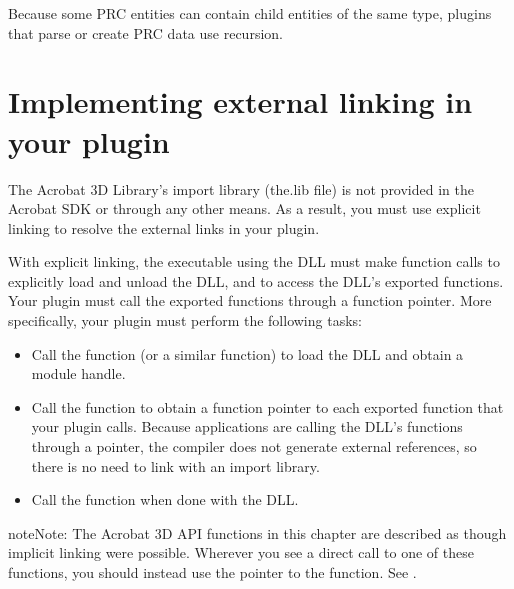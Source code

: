 \documentclass[letterpaper,12pt,english,openany,oneside]{sphinxmanual}
\begin{document}
\noindent{}

Because some PRC entities can contain child entities of the same type, plugins that parse or create PRC data use recursion.


\section{Implementing external linking in your plugin}
\label{\detokenize{Plugins_A3D_API:implementing-external-linking-in-your-plugin}}
The Acrobat 3D Library’s import library (the.lib file) is not provided in the Acrobat SDK or through any other means. As a result, you must use explicit linking to resolve the external links in your plugin.

With explicit linking, the executable using the DLL must make function calls to explicitly load and unload the DLL, and to access the DLL’s exported functions. Your plugin must call the exported functions through a function pointer. More specifically, your plugin must perform the following tasks:
\begin{itemize}
\item {} 
Call the  function (or a similar function) to load the DLL and obtain a module handle.

\item {} 
Call the  function to obtain a function pointer to each exported function that your plugin calls. Because applications are calling the DLL’s functions through a pointer, the compiler does not generate external references, so there is no need to link with an import library.

\item {} 
Call the  function when done with the DLL.

\end{itemize}

\begin{sphinxadmonition}{note}{Note:}
The Acrobat 3D API functions in this chapter are described as though implicit linking were possible. Wherever you see a direct call to one of these functions, you should instead use the pointer to the function. See .
\end{sphinxadmonition}
\end{document}
